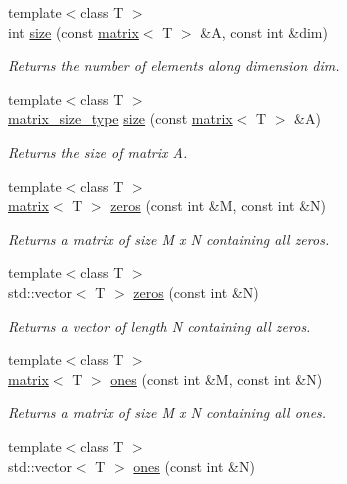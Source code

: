 \begin{DoxyCompactItemize}
\item 
{\footnotesize template$<$class T $>$ }\\int \hyperlink{namespacekeycpp_a2824156817719ffe96a842dd0ef27ae5}{size} (const \hyperlink{classkeycpp_1_1matrix}{matrix}$<$ T $>$ \&A, const int \&dim)
\begin{DoxyCompactList}\small\item\em Returns the number of elements along dimension dim. \end{DoxyCompactList}\item 
{\footnotesize template$<$class T $>$ }\\\hyperlink{structkeycpp_1_1matrix__size__type}{matrix\-\_\-size\-\_\-type} \hyperlink{namespacekeycpp_ae713df143a5e71da166f450e01a536e2}{size} (const \hyperlink{classkeycpp_1_1matrix}{matrix}$<$ T $>$ \&A)
\begin{DoxyCompactList}\small\item\em Returns the size of matrix A. \end{DoxyCompactList}\item 
{\footnotesize template$<$class T $>$ }\\\hyperlink{classkeycpp_1_1matrix}{matrix}$<$ T $>$ \hyperlink{namespacekeycpp_a5699c522088657287bf0ac01173b716c}{zeros} (const int \&M, const int \&N)
\begin{DoxyCompactList}\small\item\em Returns a matrix of size M x N containing all zeros. \end{DoxyCompactList}\item 
{\footnotesize template$<$class T $>$ }\\std\-::vector$<$ T $>$ \hyperlink{namespacekeycpp_a9a0f013931cb9989320b014d151cc527}{zeros} (const int \&N)
\begin{DoxyCompactList}\small\item\em Returns a vector of length N containing all zeros. \end{DoxyCompactList}\item 
{\footnotesize template$<$class T $>$ }\\\hyperlink{classkeycpp_1_1matrix}{matrix}$<$ T $>$ \hyperlink{namespacekeycpp_a388f91a0ccf34978ef9403ccd0c680bf}{ones} (const int \&M, const int \&N)
\begin{DoxyCompactList}\small\item\em Returns a matrix of size M x N containing all ones. \end{DoxyCompactList}\item 
{\footnotesize template$<$class T $>$ }\\std\-::vector$<$ T $>$ \hyperlink{namespacekeycpp_a831e69a9395f6dfe9e02af46e8b4273b}{ones} (const int \&N)

\end{DoxyCompactItemize}
